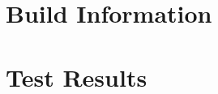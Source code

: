 \documentclass{article}
\begin{document}
\section*{Build Information}


\section*{Test Results}
\end{document}
